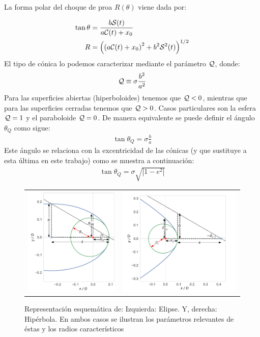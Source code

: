 La forma polar del choque de proa $R(\theta)$ viene dada por:

\begin{align}
  \tan\theta &= \frac{b\mathcal{S}(t)}{a\mathcal{C}(t) + x_0} \label{eq:t-th-conversion} \\
  R &= \left(\left(a\mathcal{C}(t) + x_0\right)^2 + b^2\mathcal{S}^2(t)\right)^{1/2} 
\end{align}
El tipo de cónica lo podemos caracterizar mediante el parámetro $\mathcal{Q}$, donde:
\begin{align}
  \mathcal{Q} \equiv \sigma\frac{b^2}{a^2} \label{eq:conic-parameter-a-b}
\end{align}
Para las superficies abiertas (hiperboloides) tenemos que $\mathcal{Q} < 0$, mientras que para las superficies cerradas tenemos que $\mathcal{Q} > 0$. Casos particulares son la esfera $\mathcal{Q} = 1$ y el paraboloide $\mathcal{Q} = 0$. De manera equivalente se puede definir el ángulo $\theta_Q$ como sigue:
\begin{align}
  \tan\theta_Q = \sigma \frac{b}{a} \label{eq:thc}
\end{align}
Este ángulo se relaciona con la excentricidad de las cónicas (y que sustituye a esta última en este trabajo) como se muestra a continuación:
\begin{align}
  \tan\theta_Q = \sigma\sqrt{\left|1-e^2\right|}
\end{align}
\begin{figure}
  \begin{tabular}{cc}
    \includegraphics[width=0.4\linewidth]{./Figures/ellipse_edited} &
    \includegraphics[width=0.5\linewidth]{./Figures/hyperbola_edited}
  \end{tabular}
  \caption{Representación esquemática de: Izquierda: Elipse. Y, derecha: Hipérbola. En ambos casos se ilustran los parámetros relevantes de éstas y los radios característicos}
  \label{fig:conics}
\end{figure}

